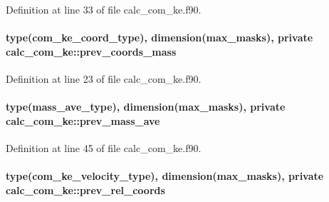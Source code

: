 Definition at line 33 of file calc\-\_\-com\-\_\-ke.\-f90.

\hypertarget{classcalc__com__ke_a5291cdd2e129d0f9af13b186501cb4be}{
\paragraph[{prev\-\_\-coords\-\_\-mass}]{\setlength{\rightskip}{0pt plus 5cm}type({\bf com\-\_\-ke\-\_\-coord\-\_\-type}), dimension({\bf max\-\_\-masks}), private calc\-\_\-com\-\_\-ke\-::prev\-\_\-coords\-\_\-mass\hspace{0.3cm}{\ttfamily [private]}}}\label{classcalc__com__ke_a5291cdd2e129d0f9af13b186501cb4be}


Definition at line 23 of file calc\-\_\-com\-\_\-ke.\-f90.

\hypertarget{classcalc__com__ke_acfb72c0740a9626bae7bd565ff0a9844}{
\paragraph[{prev\-\_\-mass\-\_\-ave}]{\setlength{\rightskip}{0pt plus 5cm}type({\bf mass\-\_\-ave\-\_\-type}), dimension({\bf max\-\_\-masks}), private calc\-\_\-com\-\_\-ke\-::prev\-\_\-mass\-\_\-ave\hspace{0.3cm}{\ttfamily [private]}}}\label{classcalc__com__ke_acfb72c0740a9626bae7bd565ff0a9844}


Definition at line 45 of file calc\-\_\-com\-\_\-ke.\-f90.

\hypertarget{classcalc__com__ke_a15c550633f7b3816a88580eaa15f66f8}{
\paragraph[{prev\-\_\-rel\-\_\-coords}]{\setlength{\rightskip}{0pt plus 5cm}type({\bf com\-\_\-ke\-\_\-velocity\-\_\-type}), dimension({\bf max\-\_\-masks}), private calc\-\_\-com\-\_\-ke\-::prev\-\_\-rel\-\_\-coords\hspace{0.3cm}{\ttfamily [private]}}}\label{classcalc__com__ke_a15c550633f7b3816a88580eaa15f66f8}


